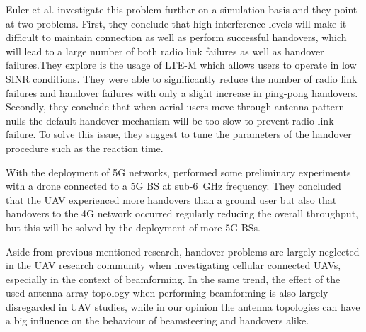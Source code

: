 \documentclass[conference,twocolumn]{IEEEtran}
\begin{document}
\par Euler et al. \cite{Euler2019} investigate this problem further on a simulation basis and they point at two problems. First, they conclude that high interference levels will make it difficult to maintain connection as well as perform successful handovers, which will lead to a large number of both radio link failures as well as handover failures.They explore is the usage of LTE-M which allows users to operate in low SINR conditions. They were able to significantly reduce the number of radio link failures and handover failures with only a slight increase in ping-pong handovers.
Secondly, they conclude that when aerial users move through antenna pattern nulls the default handover mechanism will be too slow to prevent radio link failure. To solve this issue, they suggest to tune the parameters of the handover procedure such as the reaction time.
\par With the deployment of 5G networks, \cite{Muzaffar2020} performed some preliminary experiments with a drone connected to a 5G BS at sub-6~GHz frequency. They concluded that the UAV experienced more handovers than a ground user but also that handovers to the 4G network occurred regularly reducing the overall throughput, but this will be solved by the deployment of more 5G BSs.
\par Aside from previous mentioned research, handover problems are largely neglected in the UAV research community when investigating cellular connected UAVs, especially in the context of beamforming. In the same trend, the effect of the used antenna array topology when performing beamforming is also largely disregarded in UAV studies, while in our opinion the antenna topologies can have a big influence on the behaviour of beamsteering and handovers alike.
\end{document}
